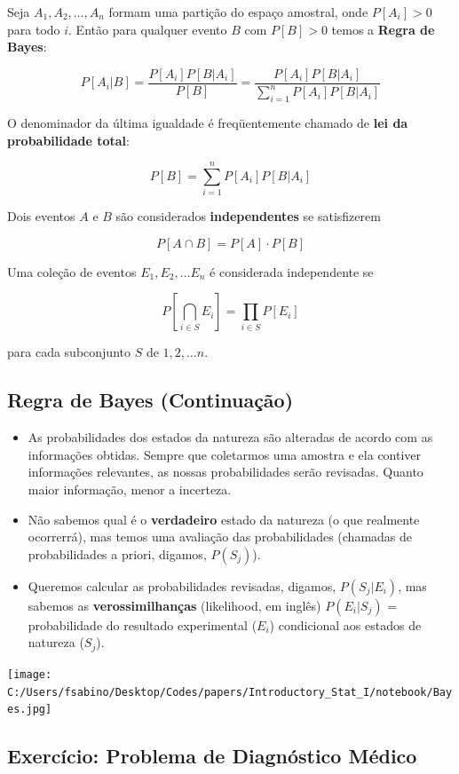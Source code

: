 \documentclass[]{article}
\begin{document}
Seja \(A_1, A_2, \ldots, A_n\) formam uma partição do espaço amostral,
onde \(P[A_i]>0\) para todo \(i\). Então para qualquer evento \(B\) com
\(P[B]>0\) temos a \textbf{Regra de Bayes}:

\[ P[A_i | B] = \frac{P[A_i] P[B | A_i]} {P[B]} = \frac{P[A_i] P[B | A_i]}{\sum_{i = 1}^{n} P[A_i] P[B | A_i]} \]

O denominador da última igualdade é freqüentemente chamado de
\textbf{lei da probabilidade total}:

\[ P[B] = \sum_{i = 1}^{n} P[A_i] P[B | A_i] \]

Dois eventos \(A\) e \(B\) são considerados \textbf{independentes} se
satisfizerem

\[ P[A \cap B] = P[A] \cdot P[B] \]

Uma coleção de eventos \(E_1, E_2, \ldots E_n\) é considerada
independente se

\[ P\left[\bigcap_{i\in S} E_i \right] = \prod_{i \in S} P[E_i] \]

para cada subconjunto \(S\) de \({1, 2,\ldots n}\).

\subsection{Regra de Bayes
(Continuação)}\label{regra-de-bayes-continuacao}

\begin{itemize}
\item
  As probabilidades dos estados da natureza são alteradas de acordo com
  as informações obtidas. Sempre que coletarmos uma amostra e ela
  contiver informações relevantes, as nossas probabilidades serão
  revisadas. Quanto maior informação, menor a incerteza.
\item
  Não sabemos qual é o \textbf{verdadeiro} estado da natureza (o que
  realmente ocorrerrá), mas temos uma avaliação das probabilidades
  (chamadas de probabilidades a priori, digamos, \(P(S_j)\)).
\item
  Queremos calcular as probabilidades revisadas, digamos,
  \(P(S_j | E_i)\), mas sabemos as \textbf{verossimilhanças}
  (likelihood, em inglês) \(P(E_i | S_j)\) = probabilidade do resultado
  experimental (\(E_i\)) condicional aos estados de natureza (\(S_j\)).
\end{itemize}

\texttt{[image: C:/Users/fsabino/Desktop/Codes/papers/Introductory\_Stat\_I/notebook/Bayes.jpg]}

\subsection{Exercício: Problema de Diagnóstico
Médico}\label{exercicio-problema-de-diagnostico-medico}
\end{document}
